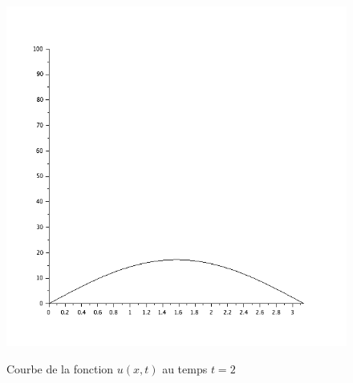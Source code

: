 \documentclass[a4paper,12pt]{report}
\begin{document}
 \begin{figure}
 	\centering
      \includegraphics[scale=0.3]{ex5_fig6.png}\\
	  \caption{Courbe  de la fonction $u(x,t)$ au temps $t=2$}
   \end{figure}
\newpage
\end{document}

